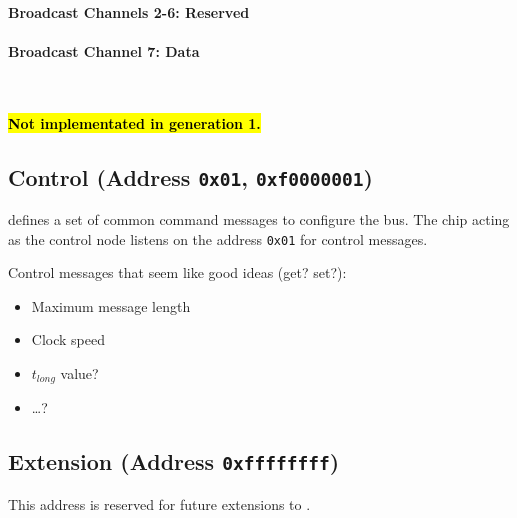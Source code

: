 \paragraph{Broadcast Channels 2-6: Reserved}
\label{sec:channel-2-6}

\paragraph{Broadcast Channel 7: Data}
\label{sec:channel-7}
~

\textbf{\hl{Not implementated in generation 1.}}

\subsection{Control (Address \texttt{0x01}, \texttt{0xf0000001})}
\label{sec:control-control}
\bus defines a set of common command messages to configure the bus. The chip
acting as the control node listens on the address {\tt 0x01} for \bus control
messages.

Control messages that seem like good ideas (get? set?):
\begin{itemize}
  \item Maximum message length
  \item Clock speed
  \item $t_{long}$ value?
  \item \ldots?
\end{itemize}

\subsection{Extension (Address \texttt{0xffffffff})}
This address is reserved for future extensions to \bus.

